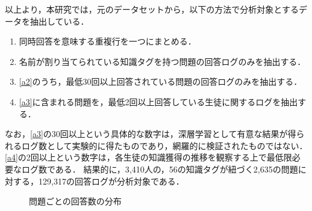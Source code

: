 以上より，本研究では，元のデータセットから，以下の方法で分析対象とするデータを抽出している．
\begin{enumerate}
	\item 同時回答を意味する重複行を一つにまとめる．\label{a1}
	\item 名前が割り当てられている知識タグを持つ問題の回答ログのみを抽出する．\label{a2}
	\item \ref{a2}のうち，最低30回以上回答されている問題の回答ログのみを抽出する．\label{a3}
	\item \ref{a3}に含まれる問題を，最低2回以上回答している生徒に関するログを抽出する．\label{a4}
\end{enumerate}

なお，\ref{a3}の30回以上という具体的な数字は，深層学習として有意な結果が得られるログ数として実験的に得たものであり，網羅的に検証されたものではない．
\ref{a4}の2回以上という数字は，各生徒の知識獲得の推移を観察する上で最低限必要なログ数である．
結果的に，3,410人の，56の知識タグが紐づく2,635の問題に対する，129,317の回答ログが分析対象である．

\begin{figure}[t]
\begin{center}
\hspace*{-20pt}
\end{center}
\caption{問題ごとの回答数の分布}
\end{figure}



